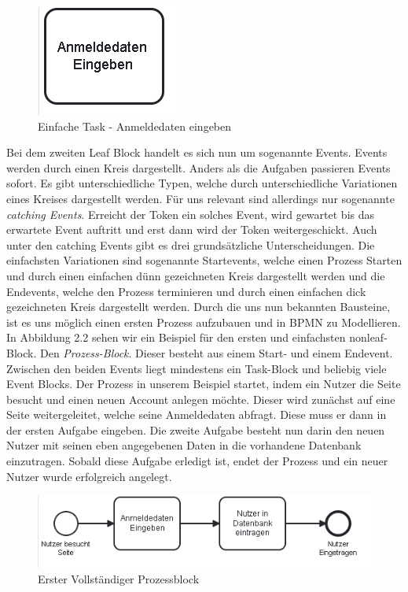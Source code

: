 \begin{figure}
\centering
\includegraphics[scale=1.0]{Figures/Beispiel1}
\decoRule
\caption[Einfache Task]{Einfache Task - Anmeldedaten eingeben}
\label{fig:Task}
\end{figure}

Bei dem zweiten Leaf Block handelt es sich nun um sogenannte Events. Events werden durch einen Kreis dargestellt. Anders als die Aufgaben passieren Events sofort. Es gibt unterschiedliche Typen, welche durch unterschiedliche Variationen eines Kreises dargestellt werden. Für uns relevant sind allerdings nur sogenannte \emph{catching Events}.  Erreicht der Token ein solches Event, wird gewartet bis das erwartete Event auftritt und erst dann wird der Token weitergeschickt. Auch unter den catching Events gibt es drei grundsätzliche Unterscheidungen. Die einfachsten Variationen sind sogenannte Startevents, welche einen Prozess Starten und durch einen einfachen dünn gezeichneten Kreis dargestellt werden und die Endevents, welche den Prozess terminieren und durch einen einfachen dick gezeichneten Kreis dargestellt werden. 
Durch die uns nun bekannten Bausteine, ist es uns möglich einen ersten Prozess aufzubauen und in BPMN zu Modellieren. In Abbildung 2.2 sehen wir ein Beispiel für den ersten und einfachsten nonleaf-Block. Den \emph{Prozess-Block}. Dieser besteht aus einem Start- und einem Endevent. Zwischen den beiden Events liegt mindestens ein Task-Block und beliebig viele Event Blocks. Der Prozess in unserem Beispiel startet, indem ein Nutzer die Seite besucht und einen neuen Account anlegen möchte. Dieser wird zunächst auf eine Seite weitergeleitet, welche seine Anmeldedaten abfragt. Diese muss er dann in der ersten Aufgabe eingeben. Die zweite Aufgabe besteht nun darin den neuen Nutzer mit seinen eben angegebenen Daten in die vorhandene Datenbank einzutragen. Sobald diese Aufgabe erledigt ist, endet der Prozess und ein neuer Nutzer wurde erfolgreich angelegt. 

\begin{figure}
\centering
\includegraphics[scale=1.0]{Figures/Beispiel2}
\decoRule
\caption[Prozess Block]{Erster Vollständiger Prozessblock}
\label{fig:Task}
\end{figure}


